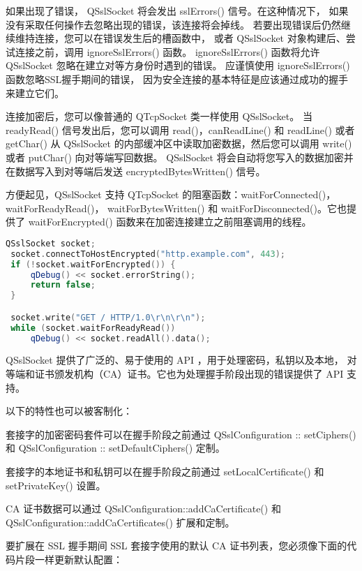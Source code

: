 如果出现了错误， QSslSocket 将会发出 sslErrors() 信号。在这种情况下，
如果没有采取任何操作去忽略出现的错误，该连接将会掉线。
若要出现错误后仍然继续维持连接，您可以在错误发生后的槽函数中，
或者 QSslSocket 对象构建后、尝试连接之前，调用 ignoreSslErrors() 函数。
ignoreSslErrors() 函数将允许 QSslSocket 忽略在建立对等方身份时遇到的错误。
 应谨慎使用 ignoreSslErrors() 函数忽略SSL握手期间的错误，
 因为安全连接的基本特征是应该通过成功的握手来建立它们。

连接加密后，您可以像普通的 QTcpSocket 类一样使用 QSslSocket。
当 readyRead() 信号发出后，您可以调用 read()，canReadLine() 和 readLine() 或者 
getChar() 从 QSslSocket 的内部缓冲区中读取加密数据，然后您可以调用 write() 或者 putChar() 向对等端写回数据。
 QSslSocket 将会自动将您写入的数据加密并在数据写入到对等端后发送 encryptedBytesWritten() 信号。

方便起见，QSslSocket 支持 QTcpSocket 的阻塞函数：waitForConnected()，waitForReadyRead()，
waitForBytesWritten() 和 waitForDisconnected()。它也提供了 waitForEncrypted()
 函数来在加密连接建立之前阻塞调用的线程。


\begin{lstlisting}[language=C++]
 QSslSocket socket;
 socket.connectToHostEncrypted("http.example.com", 443);
 if (!socket.waitForEncrypted()) {
     qDebug() << socket.errorString();
     return false;
 }

 socket.write("GET / HTTP/1.0\r\n\r\n");
 while (socket.waitForReadyRead())
     qDebug() << socket.readAll().data();
\end{lstlisting}

QSslSocket 提供了广泛的、易于使用的 API ，用于处理密码，私钥以及本地，
对等端和证书颁发机构（CA）证书。它也为处理握手阶段出现的错误提供了 API 支持。

以下的特性也可以被客制化：

\begin{compactitem}
\item 套接字的加密密码套件可以在握手阶段之前通过 QSslConfiguration :: setCiphers() 和 QSslConfiguration :: setDefaultCiphers() 定制。
\item 套接字的本地证书和私钥可以在握手阶段之前通过 setLocalCertificate() 和 setPrivateKey() 设置。
\item CA 证书数据可以通过 QSslConfiguration::addCaCertificate() 和 QSslConfiguration::addCaCertificates() 扩展和定制。
\end{compactitem}

要扩展在 SSL 握手期间 SSL 套接字使用的默认 CA 证书列表，您必须像下面的代码片段一样更新默认配置：

